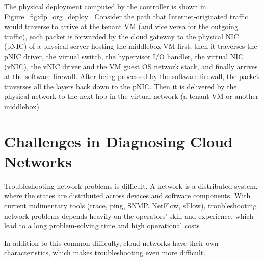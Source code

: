 The physical deployment computed by the controller is shown in
Figure~\ref{fig:dp_org_deploy}. Consider the path that
Internet-originated traffic would traverse to arrive at the tenant VM
(and vice versa for the outgoing traffic), each packet is
forwarded by the cloud gateway to the physical NIC (pNIC) of a
physical server hosting the middlebox VM first; then it traverses the
pNIC driver, the virtual switch, the hypervisor I/O handler, the
virtual NIC (vNIC), the vNIC driver and the VM guest OS network stack,
and finally arrives at the software firewall. After being processed by
the software firewall, the packet traverses all the layers back down
to the pNIC. Then it is delivered by the physical network to the next
hop in the virtual network (a tenant VM or another middlebox).

\section{Challenges in Diagnosing Cloud Networks}
\label{sec:intro:challenges}
Troubleshooting network problems is difficult. A network is a distributed
system, where the states are distributed across devices and software components.
With current rudimentary tools (trace, ping, SNMP, NetFlow, sFlow), troubleshooting
network problems depends heavily on the operators' skill and experience, which
lead to a long problem-solving time and high operational costs~\cite{ndb_thesis}.

In addition to this common difficulty, cloud networks have their own characteristics,
which makes troubleshooting even more difficult. 

